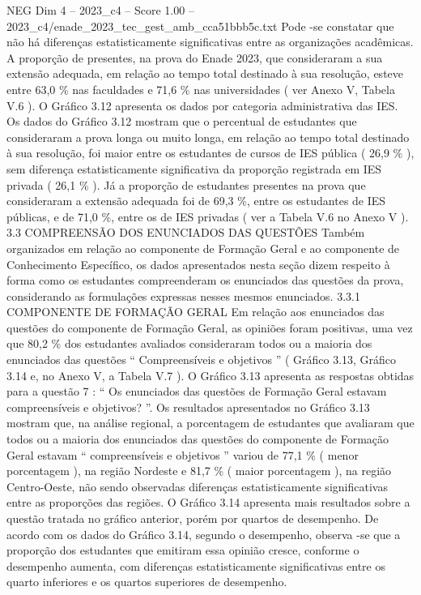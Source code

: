 \begin{textsample}{NEG Dim 4 – 2023\_c4 – Score 1.00 – 2023\_c4/enade\_2023\_tec\_gest\_amb\_cca51bbb5c.txt}
Pode -se constatar que não há diferenças estatisticamente significativas entre as organizações acadêmicas.
A proporção de presentes, na prova do Enade 2023, que consideraram a sua extensão adequada, em relação ao tempo total destinado à sua resolução, esteve entre 63,0 \% nas faculdades e 71,6 \% nas universidades ( ver Anexo V, Tabela V.6 ).
O Gráfico 3.12 apresenta os dados por categoria administrativa das IES.
Os dados do Gráfico 3.12 mostram que o percentual de estudantes que consideraram a prova longa ou muito longa, em relação ao tempo total destinado à sua resolução, foi maior entre os estudantes de cursos de IES pública ( 26,9 \% ), sem diferença estatisticamente significativa da proporção registrada em IES privada ( 26,1 \% ).
Já a proporção de estudantes presentes na prova que consideraram a extensão adequada foi de 69,3 \%, entre os estudantes de IES públicas, e de 71,0 \%, entre os de IES privadas ( ver a Tabela V.6 no Anexo V ). 3.3 COMPREENSÃO DOS ENUNCIADOS DAS QUESTÕES Também organizados em relação ao componente de Formação Geral e ao componente de Conhecimento Específico, os dados apresentados nesta seção dizem respeito à forma como os estudantes compreenderam os enunciados das questões da prova, considerando as formulações expressas nesses mesmos enunciados. 3.3.1 COMPONENTE DE FORMAÇÃO GERAL Em relação aos enunciados das questões do componente de Formação Geral, as opiniões foram positivas, uma vez que 80,2 \% dos estudantes avaliados consideraram todos ou a maioria dos enunciados das questões “ Compreensíveis e objetivos ” ( Gráfico 3.13, Gráfico 3.14 e, no Anexo V, a Tabela V.7 ).
O Gráfico 3.13 apresenta as respostas obtidas para a questão 7 : “ Os enunciados das questões de Formação Geral estavam compreensíveis e objetivos? ”.
Os resultados apresentados no Gráfico 3.13 mostram que, na análise regional, a porcentagem de estudantes que avaliaram que todos ou a maioria dos enunciados das questões do componente de Formação Geral estavam “ compreensíveis e objetivos ” variou de 77,1 \% ( menor porcentagem ), na região Nordeste e 81,7 \% ( maior porcentagem ), na região Centro-Oeste, não sendo observadas diferenças estatisticamente significativas entre as proporções das regiões.
O Gráfico 3.14 apresenta mais resultados sobre a questão tratada no gráfico anterior, porém por quartos de desempenho.
De acordo com os dados do Gráfico 3.14, segundo o desempenho, observa -se que a proporção dos estudantes que emitiram essa opinião cresce, conforme o desempenho aumenta, com diferenças estatisticamente significativas entre os quarto inferiores e os quartos superiores de desempenho.

\end{textsample}
